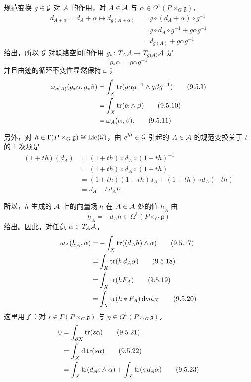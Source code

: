 规范变换 $g\in\mathcal{G}$ 对 $\mathcal{A}$ 的作用，对 $A\in\mathcal{A}$ 与 $\alpha\in\Omega^1(P\times_G\mathfrak{g})$，
\begin{align}
  d_{A+\alpha} = d_A+\alpha \mapsto d_{g(A+\alpha)} &= g\circ(d_A+\alpha)\circ g^{-1}
  \tag{9.5.5}\\
  &= g\circ d_A\circ g^{-1} + g\alpha g^{-1}
  \tag{9.5.6}\\
  &= d_{g(A)} + g\alpha g^{-1}
  \tag{9.5.7}
\end{align}
给出，所以 $\mathcal{G}$ 对联络空间的作用 $g_*\colon T_A\mathcal{A}\to T_{g(A)}\mathcal{A}$ 是
\begin{equation}
  g_*\alpha = g\alpha g^{-1}
  \tag{9.5.8}
\end{equation}
并且由迹的循环不变性显然保持 $\omega$；
\begin{align}
  \omega_{g(A)}(g_*\alpha,g_*\beta) &= \int_X \operatorname{tr}(g\alpha g^{-1}\wedge g\beta g^{-1})
  \tag{9.5.9}\\
  &= \int_X \operatorname{tr}(\alpha\wedge\beta)
  \tag{9.5.10}\\
  &= \omega_A(\alpha,\beta).
  \tag{9.5.11}
\end{align}

另外，对 $h\in\Gamma(P\times_G\mathfrak{g})\cong\operatorname{Lie}(\mathcal{G})$，由 $e^{ht}\in\mathcal{G}$ 引起的 $A\in\mathcal{A}$ 的规范变换关于 $t$ 的 1 次项是
\begin{align}
  (1+th)(d_A) &= (1+th)\circ d_A\circ(1+th)^{-1}
  \tag{9.5.12}\\
  &= (1+th)\circ d_A\circ(1-th)
  \tag{9.5.13}\\
  &= (1+th)(1-th)d_A + (1+th)\circ d_A(-th)
  \tag{9.5.14}\\
  &= d_A - t\, d_A h
  \tag{9.5.15}
\end{align}

所以，$h$ 生成的 $\mathcal{A}$ 上的向量场 $\underline{h}$ 在 $A\in\mathcal{A}$ 处的值 $\underline{h}_A$ 由
\begin{equation}
  \underline{h}_A = -d_A h \in \Omega^1(P\times_G\mathfrak{g})
  \tag{9.5.16}
\end{equation}
给出。因此，对任意 $\alpha\in T_A\mathcal{A}$，
\begin{align}
  \omega_A(\underline{h}_A,\alpha) &= -\int_X \operatorname{tr}((d_A h)\wedge\alpha)
  \tag{9.5.17}\\
  &= \int_X \operatorname{tr}(h\, d_A\alpha)
  \tag{9.5.18}\\
  &= \int_X \operatorname{tr}(hF_A)
  \tag{9.5.19}\\
  &= \int_X \operatorname{tr}(h*F_A)\, \mathrm{d}\mathrm{vol}_X
  \tag{9.5.20}
\end{align}
这里用了：对 $s\in\Gamma(P\times_G\mathfrak{g})$ 与 $\eta\in\Omega^1(P\times_G\mathfrak{g})$，
\begin{align}
  0 &= \int_{\partial X}\operatorname{tr}(s\alpha)
  \tag{9.5.21}\\
  &= \int_X \mathrm{d}\operatorname{tr}(s\alpha)
  \tag{9.5.22}\\
  &= \int_X \operatorname{tr}(d_A s\wedge\alpha) + \int_X \operatorname{tr}(s\, d_A\alpha)
  \tag{9.5.23}
\end{align}

